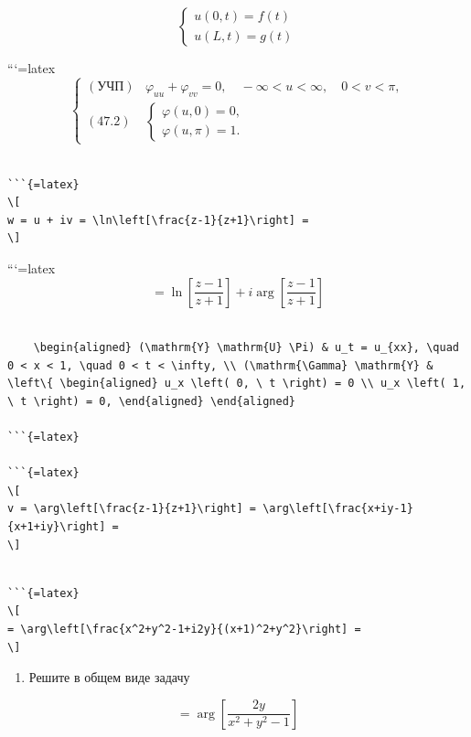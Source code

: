 \documentclass[
]{article}
\providecommand{\tightlist}{%
  \setlength{\itemsep}{0pt}\setlength{\parskip}{0pt}}
\begin{document}
\[
\begin{cases} u(0, t) = f(t) \\ u(L, t) = g(t) \end{cases}
\]

```{=latex}
\[
\begin{cases} (\text{УЧП}) & \varphi_{uu} + \varphi_{vv} = 0, \quad -\infty < u < \infty, \quad 0 < v < \pi, \\ (\text{47.2}) & \begin{cases} \varphi(u, 0) = 0, \\ \varphi(u, \pi) = 1. \end{cases} \end{cases}
\]

\begin{verbatim}

```{=latex}
\[
w = u + iv = \ln\left[\frac{z-1}{z+1}\right] =
\]
\end{verbatim}

```{=latex}
\[
= \ln\left[\frac{z-1}{z+1}\right] + i \arg\left[\frac{z-1}{z+1}\right]
\]

\begin{verbatim}

    \begin{aligned} (\mathrm{Y} \mathrm{U} \Pi) & u_t = u_{xx}, \quad 0 < x < 1, \quad 0 < t < \infty, \\ (\mathrm{\Gamma} \mathrm{Y} & \left\{ \begin{aligned} u_x \left( 0, \ t \right) = 0 \\ u_x \left( 1, \ t \right) = 0, \end{aligned} \end{aligned}

```{=latex}

```{=latex}
\[
v = \arg\left[\frac{z-1}{z+1}\right] = \arg\left[\frac{x+iy-1}{x+1+iy}\right] =
\]
\end{verbatim}

\begin{verbatim}

```{=latex}
\[
= \arg\left[\frac{x^2+y^2-1+i2y}{(x+1)^2+y^2}\right] =
\]
\end{verbatim}

\begin{enumerate}
\def\labelenumi{\arabic{enumi}.}
\setcounter{enumi}{1}
\tightlist
\item
  Решите в общем виде задачу
\end{enumerate}

\[
= \arg\left[\frac{2y}{x^2+y^2-1}\right]
\]
\end{document}
